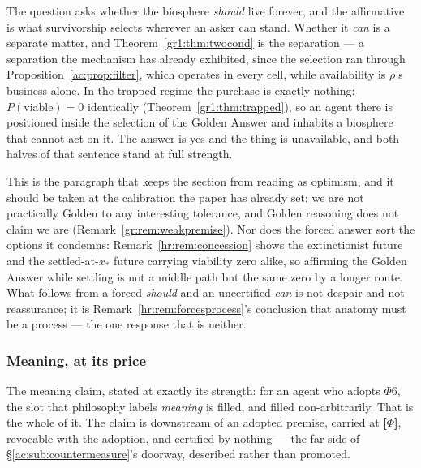 \documentclass[11pt]{article}
\numberwithin{equation}{section}
\theoremstyle{plain}
\theoremstyle{definition}
\theoremstyle{remark}
\begin{document}
The question asks whether the biosphere \emph{should} live forever, and the affirmative is what survivorship selects wherever an asker can stand. Whether it \emph{can} is a separate matter, and Theorem~\ref{gr1:thm:twocond} is the separation --- a separation the mechanism has already exhibited, since the selection ran through Proposition~\ref{ac:prop:filter}, which operates in every cell, while availability is $\rho$'s business alone. In the trapped regime the purchase is exactly nothing: $P(\text{viable}) = 0$ identically (Theorem~\ref{gr1:thm:trapped}), so an agent there is positioned inside the selection of the Golden Answer and inhabits a biosphere that cannot act on it. The answer is yes and the thing is unavailable, and both halves of that sentence stand at full strength.

This is the paragraph that keeps the section from reading as optimism, and it should be taken at the calibration the paper has already set: we are not practically Golden to any interesting tolerance, and Golden reasoning does not claim we are (Remark~\ref{gr:rem:weakpremise}). Nor does the forced answer sort the options it condemns: Remark~\ref{hr:rem:concession} shows the extinctionist future and the settled-at-$x_\ast$ future carrying viability zero alike, so affirming the Golden Answer while settling is not a middle path but the same zero by a longer route. What follows from a forced \emph{should} and an uncertified \emph{can} is not despair and not reassurance; it is Remark~\ref{hr:rem:forcesprocess}'s conclusion that anatomy must be a process --- the one response that is neither.

\subsubsection{Meaning, at its price}\label{ac:ssub:meaning}

The meaning claim, stated at exactly its strength: for an agent who adopts $\Phi6$, the slot that philosophy labels \emph{meaning} is filled, and filled non-arbitrarily. That is the whole of it. The claim is downstream of an adopted premise, carried at \textbf{[$\Phi$]}, revocable with the adoption, and certified by nothing --- the far side of \S\ref{ac:sub:countermeasure}'s doorway, described rather than promoted.
\end{document}
